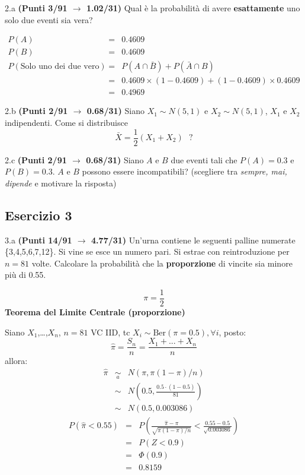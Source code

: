 \documentclass[
  11pt,
]{book}
\theoremstyle{mytheoremstyle}
\theoremstyle{mydefstyle}
\newenvironment{sol}
  {
  \begin{tcolorbox}[enhanced,breakable,arc=0.1mm,boxrule=1pt,colback=white,colframe=iblue,
  title=\bf \fontfamily{lmss}\selectfont \hspace{.5 cm} Soluzione,drop fuzzy shadow]

}{
\end{tcolorbox}
  }
\begin{document}
2.a \textbf{(Punti 3/91 \(\rightarrow\) 1.02/31)} Qual è la probabilità di avere \textbf{esattamente} uno solo due eventi sia vera?

\begin{sol}
\begin{eqnarray*}
  P(A) &=&  0.4609\\
  P(B) &=& 0.4609\\
  P(\text{Solo uno dei due vero}) &=& P(A\cap\bar B)+P(\bar A\cap B)\\
  &=& 0.4609\times (1 - 0.4609)+(1-0.4609)\times  0.4609\\
  &=& 0.4969
\end{eqnarray*}

\end{sol}

2.b \textbf{(Punti 2/91 \(\rightarrow\) 0.68/31)} Siano \(X_1\sim N(5,1)\) e \(X_2\sim N(5,1)\), \(X_1\) e \(X_2\) indipendenti. Come si distribuisce
\[
\bar X = \frac 12 (X_1+X_2) ~~~?
\]

2.c \textbf{(Punti 2/91 \(\rightarrow\) 0.68/31)} Siano \(A\) e \(B\) due eventi tali che \(P(A)=0.3\) e \(P(B)=0.3\). \(A\) e \(B\) possono essere incompatibili? (scegliere tra \emph{sempre, mai, dipende} e motivare la risposta)

\subsection{Esercizio 3}\label{esercizio-3-32}

3.a \textbf{(Punti 14/91 \(\rightarrow\) 4.77/31)} Un'urna contiene le seguenti palline numerate \{3,4,5,6,7,12\}. Si vine se esce un numero pari. Si estrae con reintroduzione per \(n=81\) volte.
Calcolare la probabilità che la \textbf{proporzione} di vincite sia minore più di 0.55.

\begin{sol}
\[\pi=\frac 12\]
\textbf{Teorema del Limite Centrale (proporzione)}

Siano \(X_1\),\ldots,\(X_n\), \(n=81\) VC IID, tc \(X_i\sim\text{Ber}(\pi=0.5)\)\(,\forall i\), posto:
\[
      \hat\pi=\frac{S_n}n = \frac{X_1 + ... + X_n}n
      \]
allora:\begin{eqnarray*}
  \hat\pi & \mathop{\sim}\limits_{a}& N(\pi,\pi(1-\pi)/n) \\
  &\sim & N\left(0.5,\frac{0.5\cdot(1-0.5)}{81}\right) \\
     &\sim & N(0.5,0.003086) 
  \end{eqnarray*}\begin{eqnarray*}
      P( \hat\pi   <   0.55 ) 
        &=& P\left(  \frac { \hat\pi  -  \pi }{ \sqrt{\pi(1-\pi)/n} }  <  \frac { 0.55  -  0.5 }{\sqrt{ 0.003086 }} \right)  \\
                 &=& P\left(  Z   <   0.9 \right) \\    
                 &=&  \Phi( 0.9 ) \\ &=&  0.8159 
      \end{eqnarray*}

\end{sol}
\end{document}
